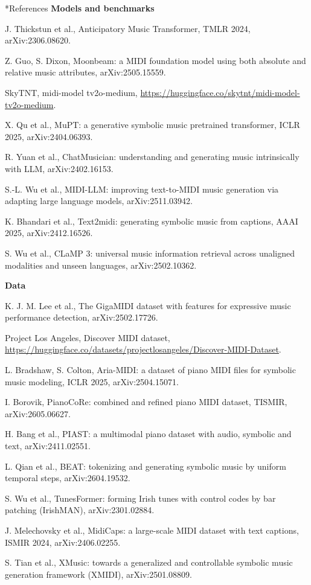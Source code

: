 \documentclass[11pt,a4paper]{article}
\makeatletter
\newcounter{refc}
\renewcommand\section{\@startsection{section}{1}{\z@}{-3.2ex \@plus -1ex \@minus -.2ex}{1.8ex \@plus .2ex}%
  {\normalfont\Large\bfseries\color{head}}}
\makeatother
\begin{document}
\section*{References}
\textbf{Models and benchmarks}
\begin{enumerate}[label={[\arabic*]},nosep,leftmargin=2.2em]
\item J. Thickstun et al., Anticipatory Music Transformer, TMLR 2024, arXiv:2306.08620.
\item Z. Guo, S. Dixon, Moonbeam: a MIDI foundation model using both absolute and relative music attributes,
arXiv:2505.15559.
\item SkyTNT, midi-model tv2o-medium, \url{https://huggingface.co/skytnt/midi-model-tv2o-medium}.
\item X. Qu et al., MuPT: a generative symbolic music pretrained transformer, ICLR 2025, arXiv:2404.06393.
\item R. Yuan et al., ChatMusician: understanding and generating music intrinsically with LLM, arXiv:2402.16153.
\item S.-L. Wu et al., MIDI-LLM: improving text-to-MIDI music generation via adapting large language models,
arXiv:2511.03942.
\item K. Bhandari et al., Text2midi: generating symbolic music from captions, AAAI 2025, arXiv:2412.16526.
\item S. Wu et al., CLaMP 3: universal music information retrieval across unaligned modalities and unseen
languages, arXiv:2502.10362.
\setcounter{refc}{\value{enumi}}
\end{enumerate}

\textbf{Data}
\begin{enumerate}[label={[\arabic*]},nosep,leftmargin=2.2em]
\setcounter{enumi}{\value{refc}}
\item K. J. M. Lee et al., The GigaMIDI dataset with features for expressive music performance detection,
arXiv:2502.17726.
\item Project Los Angeles, Discover MIDI dataset,
\url{https://huggingface.co/datasets/projectlosangeles/Discover-MIDI-Dataset}.
\item L. Bradshaw, S. Colton, Aria-MIDI: a dataset of piano MIDI files for symbolic music modeling, ICLR 2025,
arXiv:2504.15071.
\item I. Borovik, PianoCoRe: combined and refined piano MIDI dataset, TISMIR, arXiv:2605.06627.
\item H. Bang et al., PIAST: a multimodal piano dataset with audio, symbolic and text, arXiv:2411.02551.
\item L. Qian et al., BEAT: tokenizing and generating symbolic music by uniform temporal steps, arXiv:2604.19532.
\item S. Wu et al., TunesFormer: forming Irish tunes with control codes by bar patching (IrishMAN),
arXiv:2301.02884.
\item J. Melechovsky et al., MidiCaps: a large-scale MIDI dataset with text captions, ISMIR 2024, arXiv:2406.02255.
\item S. Tian et al., XMusic: towards a generalized and controllable symbolic music generation framework (XMIDI),
arXiv:2501.08809.
\setcounter{refc}{\value{enumi}}
\end{enumerate}
\end{document}
